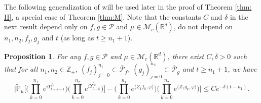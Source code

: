 \documentclass[12pt,a4paper]{amsart}
\theoremstyle{plain}
\newtheorem{prop}[thm]{Proposition}
\theoremstyle{definition}
\numberwithin{equation}{section}
\begin{document}
	The following generalization of \cite[Proposition 3.5]{RenSongSunZhao2019Stable} will be used later in the proof of  Theorem \ref{thm: II}, a special case of Theorem \ref{thm:M}.
	Note that the constants $C$ and $\delta$ in the next result depend only on $f,g\in \mathcal P$ and $\mu\in \mathcal M_c(\mathbb R^d)$, do not depend on $n_1, n_2, f_j, g_j$ and $t$ (as long as $t\geq n_1+1$).

\begin{prop} \label{cor:MI}
	For any  $f,g\in \mathcal P$ and $\mu\in \mathcal M_c(\mathbb R^d)$, there exist $C,\delta>0$ such that for all $n_1,n_2 \in \mathbb Z_+$, $(f_j)_{j=0}^{n_1}\subset \overline{\mathcal P}_f$, $(g_j)_{j=0}^{n_2}\subset \overline{\mathcal P}_g$ and $t\geq n_1+1$, we have
\begin{equation}
\label{32corollary}
	\Big|\mathbb{\widetilde{P}}_{\mu}\Big[  \Big(\prod_{k=0}^{n_1}e^{i \Upsilon^{f_k}_{t-k-1}}\Big)  \Big( \prod_{k=0}^{n_2}e^{i \Upsilon^{g_k}_{t+k} } \Big) \Big]  -  \Big(\prod_{k=0}^{n_1} e^{\langle Z_1f_k, \varphi\rangle}\Big) \Big(\prod_{k=0}^{n_2} e^{\langle Z_1g_k, \varphi\rangle}\Big) \Big|
	\leq C e^{-\delta (t-n_1)}.
\end{equation}
\end{prop}
\end{document}
